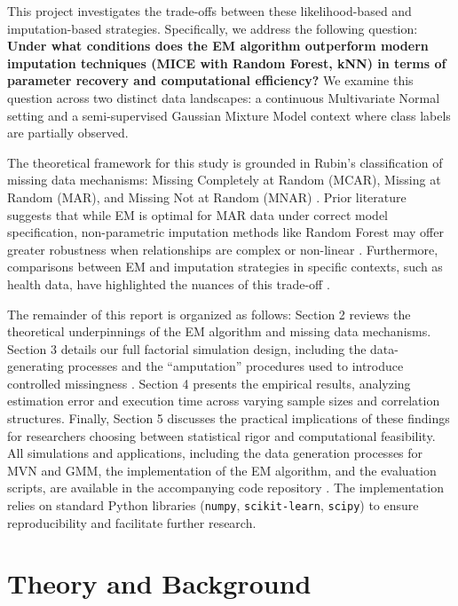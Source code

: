 \documentclass[11pt, a4paper]{article}
\begin{document}
This project investigates the trade-offs between these likelihood-based and imputation-based strategies.
Specifically, we address the following question: \textbf{Under what conditions does the EM algorithm outperform modern imputation techniques (MICE with Random Forest, kNN) in terms of parameter recovery and computational efficiency?} We examine this question across two distinct data landscapes: a continuous Multivariate Normal setting and a semi-supervised Gaussian Mixture Model context where class labels are partially observed.

The theoretical framework for this study is grounded in Rubin's classification of missing data mechanisms: Missing Completely at Random (MCAR), Missing at Random (MAR), and Missing Not at Random (MNAR) \citep{LittleRubin2019}.
Prior literature suggests that while EM is optimal for MAR data under correct model specification, non-parametric imputation methods like Random Forest may offer greater robustness when relationships are complex or non-linear \citep{Stekhoven2012, Louppe2014}. 
Furthermore, comparisons between EM and imputation strategies in specific contexts, such as health data, have highlighted the nuances of this trade-off \citep{Avtar2019}.

The remainder of this report is organized as follows: Section 2 reviews the theoretical underpinnings of the EM algorithm and missing data mechanisms.
Section 3 details our full factorial simulation design, including the data-generating processes and the ``amputation'' procedures used to introduce controlled missingness \citep{Schouten2018}.
Section 4 presents the empirical results, analyzing estimation error and execution time across varying sample sizes and correlation structures.
Finally, Section 5 discusses the practical implications of these findings for researchers choosing between statistical rigor and computational feasibility. \\
All simulations and applications, including the data generation processes for MVN and GMM, the implementation of the EM algorithm, and the evaluation scripts, are available in the accompanying code repository \cite{repository}. The implementation relies on standard Python libraries (\texttt{numpy}, \texttt{scikit-learn}, \texttt{scipy}) to ensure reproducibility and facilitate further research.


\section{Theory and Background} 
\end{document}
